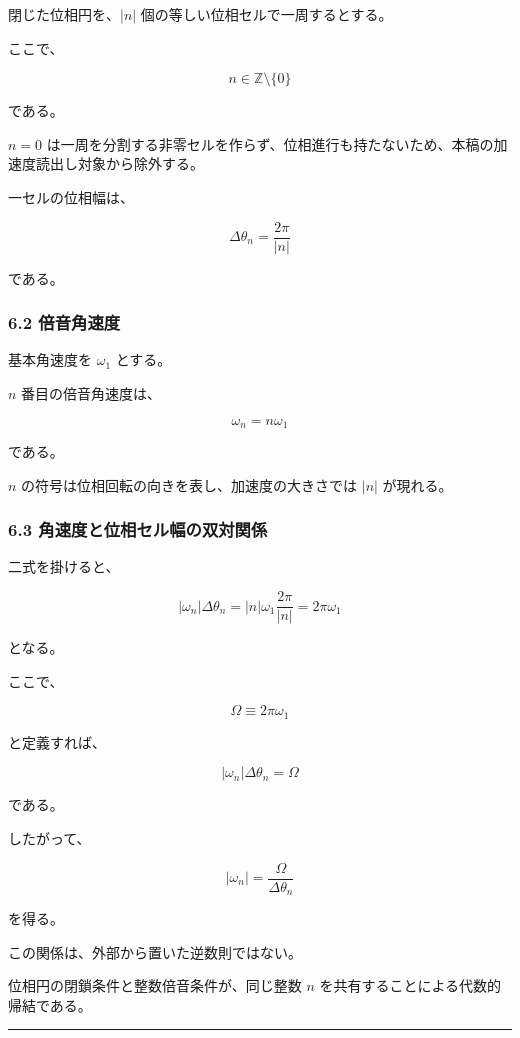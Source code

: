\documentclass[
  10pt,
  a4paper,
]{ltjsarticle}
\begin{document}
閉じた位相円を、\(|n|\) 個の等しい位相セルで一周するとする。

ここで、

\[
n\in\mathbb Z\setminus\{0\}
\]

である。

\(n=0\)
は一周を分割する非零セルを作らず、位相進行も持たないため、本稿の加速度読出し対象から除外する。

一セルの位相幅は、

\[
\boxed{
\Delta\theta_n
=\frac{2\pi}{|n|}
}
\]

である。

\subsubsection{6.2 倍音角速度}\label{ux500dux97f3ux89d2ux901fux5ea6}

基本角速度を \(\omega_1\) とする。

\(n\) 番目の倍音角速度は、

\[
\boxed{
\omega_n=n\omega_1
}
\]

である。

\(n\) の符号は位相回転の向きを表し、加速度の大きさでは \(|n|\)
が現れる。

\subsubsection{6.3
角速度と位相セル幅の双対関係}\label{ux89d2ux901fux5ea6ux3068ux4f4dux76f8ux30bbux30ebux5e45ux306eux53ccux5bfeux95a2ux4fc2}

二式を掛けると、

\[
|\omega_n|\Delta\theta_n
=|n|\omega_1\frac{2\pi}{|n|}
=2\pi\omega_1
\]

となる。

ここで、

\[
\Omega\equiv2\pi\omega_1
\]

と定義すれば、

\[
\boxed{
|\omega_n|\Delta\theta_n=\Omega
}
\]

である。

したがって、

\[
\boxed{
|\omega_n|
=\frac{\Omega}{\Delta\theta_n}
}
\]

を得る。

この関係は、外部から置いた逆数則ではない。

位相円の閉鎖条件と整数倍音条件が、同じ整数 \(n\)
を共有することによる代数的帰結である。

\begin{center}\rule{0.5\linewidth}{0.5pt}\end{center}
\end{document}
